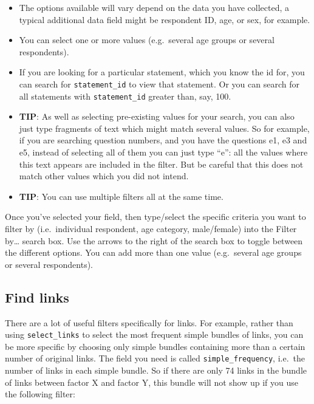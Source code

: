 \documentclass[
]{book}
\providecommand{\tightlist}{%
  \setlength{\itemsep}{0pt}\setlength{\parskip}{0pt}}
\begin{document}
\begin{itemize}
\tightlist
\item
  The options available will vary depend on the data you have collected, a typical additional data field might be respondent ID, age, or sex, for example.
\item
  You can select one or more values (e.g.~several age groups or several respondents).
\item
  If you are looking for a particular statement, which you know the id for, you can search for \texttt{statement\_id} to view that statement. Or you can search for all statements with \texttt{statement\_id} greater than, say, 100.
\item
  \textbf{TIP}: As well as selecting pre-existing values for your search, you can also just type fragments of text which might match several values. So for example, if you are searching question numbers, and you have the questions e1, e3 and e5, instead of selecting all of them you can just type ``e'': all the values where this text appears are included in the filter. But be careful that this does not match other values which you did not intend.
\item
  \textbf{TIP}: You can use multiple filters all at the same time.
\end{itemize}

Once you've selected your field, then type/select the specific criteria you want to filter by (i.e.~individual respondent, age category, male/female) into the Filter by\ldots{} search box. Use the arrows to the right of the search box to toggle between the different options. You can add more than one value (e.g.~several age groups or several respondents).

\hypertarget{find-links}{%
\subsection{Find links}\label{find-links}}

There are a lot of useful filters specifically for links. For example, rather than using \texttt{select\_links} to select the most frequent simple bundles of links, you can be more specific by choosing only simple bundles containing more than a certain number of original links. The field you need is called \texttt{simple\_frequency}, i.e.~the number of links in each simple bundle. So if there are only 74 links in the bundle of links between factor X and factor Y, this bundle will not show up if you use the following filter:
\end{document}
